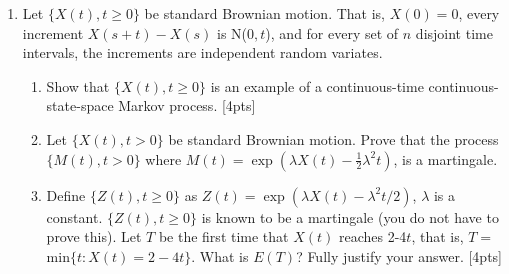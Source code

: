 \documentclass[12pt]{article}
\begin{document}
\begin{enumerate}
\newpage

 \item  Let $\{X(t),t\geq 0\}$ be standard Brownian motion. That is,
   $X(0)=0$, every increment $X(s+t)-X(s)$ is N($0,t$), and for every
   set of $n$ disjoint time intervals, the increments are independent
   random variates.
 \begin{enumerate}
 \item Show that $\{X(t),t\geq 0\}$ is an example of a continuous-time
   continuous-state-space Markov process. [4pts]%
\item Let $\{X(t), t>0\}$ be standard Brownian motion. Prove that the
  process $\{M(t), t>0\}$ where $M(t) = \exp\left(\lambda X(t) -
    \frac{1}{2} \lambda^2 t\right)$, is a martingale.
 \item Define $\{Z(t),t\geq 0\}$ as $Z(t)=\exp(\lambda X(t) - \lambda^2
   t/2)$, 
  $\lambda$ is a constant. $\{Z(t),t\geq 0\}$ is known to be a martingale (you
   do not have to prove this). Let $T$ be the first time that $X(t)$
   reaches 2-4$t$, that is,  $T=$min$\{t: X(t)= 2-4t\}$. What is
   $E(T)$? Fully justify your answer. [4pts]
 \end{enumerate}

\newpage



\end{enumerate}
\end{document}
